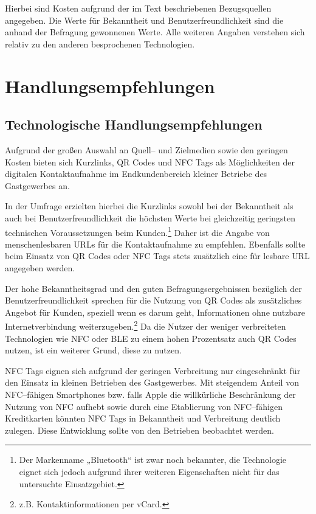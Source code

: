 Hierbei sind Kosten aufgrund der im Text beschriebenen Bezugsquellen angegeben. Die Werte für Bekanntheit und Benutzerfreundlichkeit sind die anhand der Befragung gewonnenen Werte. Alle weiteren Angaben verstehen sich relativ zu den anderen besprochenen Technologien.



\newpage
\section{Handlungsempfehlungen} %
\label{sec:handlungsempfehlungen}

\subsection{Technologische Handlungsempfehlungen} %
\label{sub:technologische_handlungsempfehlungen}
Aufgrund der großen Auswahl an Quell– und Zielmedien sowie den geringen Kosten bieten sich Kurzlinks, QR Codes und NFC Tags als Möglichkeiten der digitalen Kontaktaufnahme im Endkundenbereich kleiner Betriebe des Gastgewerbes an. 

In der Umfrage erzielten hierbei die Kurzlinks sowohl bei der Bekanntheit als auch bei Benutzerfreundlichkeit die höchsten Werte bei gleichzeitig geringsten technischen Voraussetzungen beim Kunden.\footnote{Der Markenname „Bluetooth“ ist zwar noch bekannter, die Technologie eignet sich jedoch aufgrund ihrer weiteren Eigenschaften nicht für das untersuchte Einsatzgebiet.} Daher ist die Angabe von menschenlesbaren \ac{URL}s für die Kontaktaufnahme zu empfehlen. Ebenfalls sollte beim Einsatz von QR Codes oder NFC Tags stets zusätzlich eine für lesbare \ac{URL} angegeben werden.

Der hohe Bekanntheitsgrad und den guten Befragungsergebnissen bezüglich der Benutzerfreundlichkeit sprechen für die Nutzung von QR Codes als zusätzliches Angebot für Kunden, speziell wenn es darum geht, Informationen ohne nutzbare Internetverbindung weiterzugeben.\footnote{z.B. Kontaktinformationen per vCard.} Da die Nutzer der weniger verbreiteten Technologien wie NFC oder BLE zu einem hohen Prozentsatz auch QR Codes nutzen, ist ein weiterer Grund, diese zu nutzen.

NFC Tags eignen sich aufgrund der geringen Verbreitung nur eingeschränkt für den Einsatz in kleinen Betrieben des Gastgewerbes. Mit steigendem Anteil von NFC–fähigen Smartphones bzw. falls Apple die willkürliche Beschränkung der Nutzung von NFC aufhebt sowie durch eine Etablierung von NFC–fähigen Kreditkarten könnten NFC Tags in Bekanntheit und Verbreitung deutlich zulegen. Diese Entwicklung sollte von den Betrieben beobachtet werden.

